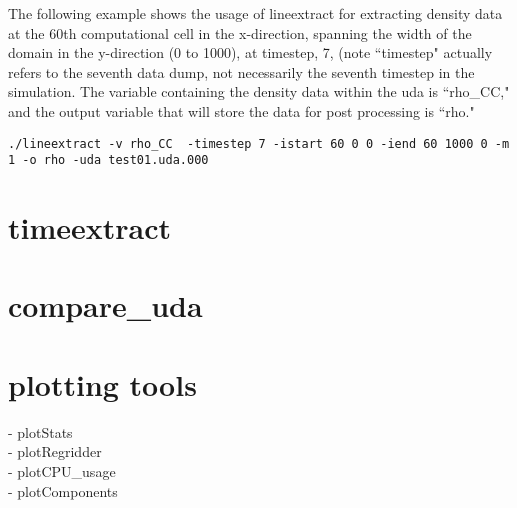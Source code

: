 The following example shows the usage of lineextract for extracting density data at the 60th computational cell in the x-direction, spanning the width of the domain in the y-direction (0 to 1000), at timestep, 7, (note ``timestep" actually 
refers to the seventh data dump, not necessarily the seventh timestep in the 
simulation. The variable containing the density data within the uda is ``rho\_CC," and the output variable that will store the data for post processing is ``rho."
\begin{Verbatim}[fontsize=\footnotesize]
./lineextract -v rho_CC  -timestep 7 -istart 60 0 0 -iend 60 1000 0 -m 1 -o rho -uda test01.uda.000
\end{Verbatim}

\section{timeextract}

\section{compare\_uda}

\section{plotting tools}
- plotStats\\
- plotRegridder \\
- plotCPU\_usage \\
- plotComponents

